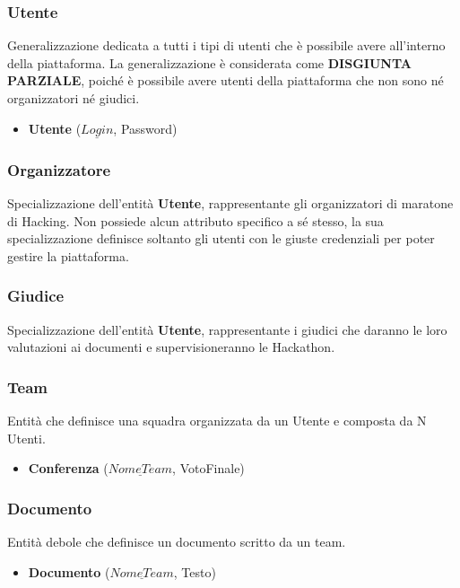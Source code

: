 \documentclass[a4paper, 11pt]{article}
\begin{document}
	\subsubsection{Utente}
	Generalizzazione dedicata a tutti i tipi di utenti che è possibile avere all'interno della piattaforma.
	La generalizzazione è considerata come \textbf{DISGIUNTA PARZIALE}, poiché è possibile avere utenti della piattaforma che non sono né organizzatori né giudici.
	\begin{itemize}
		\item \textbf{Utente} ($\underline{Login}$, Password)
	\end{itemize}
	\subsubsection{Organizzatore}
	Specializzazione dell'entità \textbf{Utente}, rappresentante gli organizzatori di maratone di Hacking.
	Non possiede alcun attributo specifico a sé stesso, la sua specializzazione definisce soltanto gli utenti con le giuste credenziali per poter gestire la piattaforma.
	\subsubsection{Giudice}
	Specializzazione dell'entità \textbf{Utente}, rappresentante i giudici che daranno le loro valutazioni ai documenti e supervisioneranno le Hackathon.
	\subsubsection{Team}
	Entità che definisce una squadra organizzata da un Utente e composta da N Utenti.
	\begin{itemize}
		\item \textbf{Conferenza} ($\underline{NomeTeam}$, VotoFinale)
	\end{itemize}
	\subsubsection{Documento}
	Entità debole che definisce un documento scritto da un team.
	\begin{itemize}
		\item \textbf{Documento} ($\underline{NomeTeam}$, Testo)
	\end{itemize}
	\newpage
\end{document}

